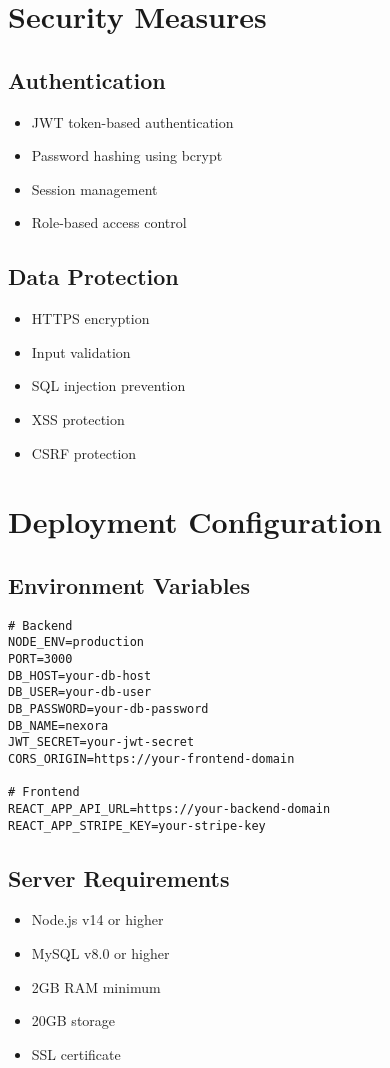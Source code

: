 \section{Security Measures}
\subsection{Authentication}
\begin{itemize}
    \item JWT token-based authentication
    \item Password hashing using bcrypt
    \item Session management
    \item Role-based access control
\end{itemize}

\subsection{Data Protection}
\begin{itemize}
    \item HTTPS encryption
    \item Input validation
    \item SQL injection prevention
    \item XSS protection
    \item CSRF protection
\end{itemize}

\section{Deployment Configuration}
\subsection{Environment Variables}
\begin{verbatim}
# Backend
NODE_ENV=production
PORT=3000
DB_HOST=your-db-host
DB_USER=your-db-user
DB_PASSWORD=your-db-password
DB_NAME=nexora
JWT_SECRET=your-jwt-secret
CORS_ORIGIN=https://your-frontend-domain

# Frontend
REACT_APP_API_URL=https://your-backend-domain
REACT_APP_STRIPE_KEY=your-stripe-key
\end{verbatim}

\subsection{Server Requirements}
\begin{itemize}
    \item Node.js v14 or higher
    \item MySQL v8.0 or higher
    \item 2GB RAM minimum
    \item 20GB storage
    \item SSL certificate
\end{itemize}

